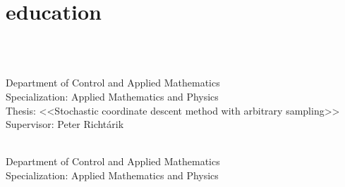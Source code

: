 \documentclass[]{deedy-resume-openfont}
\begin{document}
\begin{minipage}[t]{0.66\textwidth} 

\section{education}
\\
\begin{tightemize}
	\item
{}\\
Department of Control and Applied Mathematics\\
Specialization: Applied Mathematics and Physics\\
Thesis: <<Stochastic coordinate descent method with arbitrary sampling>>\\
\normalsize Supervisor: Peter Richt{\'a}rik\\
\vspace{0.1em}
\item
{}\\
Department of Control and Applied Mathematics\\
Specialization: Applied Mathematics and Physics\\
\end{tightemize}
\vspace{0.1em}

\end{minipage}
\end{document}
